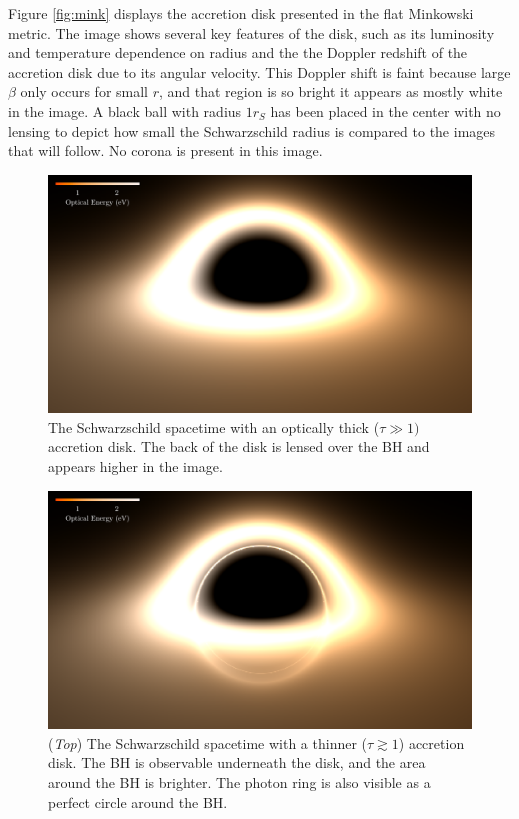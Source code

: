 \documentclass[twocolumn,twocolappendix]{aastex631}
\begin{document}
Figure \ref{fig:mink} displays the accretion disk presented in the flat Minkowski metric. The image shows several key features of the disk, such as its luminosity and temperature dependence on radius and the the Doppler redshift of the accretion disk due to its angular velocity. This Doppler shift is faint because large $\beta$ only occurs for small $r$, and that region is so bright it appears as mostly white in the image. A black ball with radius $1 r_S$ has been placed in the center with no lensing to depict how small the Schwarzschild radius is compared to the images that will follow. No corona is present in this image.

\begin{figure}
  \centering
  \includegraphics[width=\linewidth]{../imager/small/thick-optical.pdf}
  \caption{The Schwarzschild spacetime with an optically thick ($\tau \gg 1)$ accretion disk. The back of the disk is lensed over the BH and appears higher in the image.}
  \label{fig:thick}
\end{figure}

\begin{figure}[htbp!]
  \centering
  \includegraphics[width=\linewidth]{../imager/small/thin-optical.pdf}
  \caption{(\textit{Top}) The Schwarzschild spacetime with a thinner ($\tau \gtrsim 1$) accretion disk. The BH is observable underneath the disk, and the area around the BH is brighter. The photon ring is also visible as a perfect circle around the BH.}
  \label{fig:thin}
\end{figure}
\end{document}
